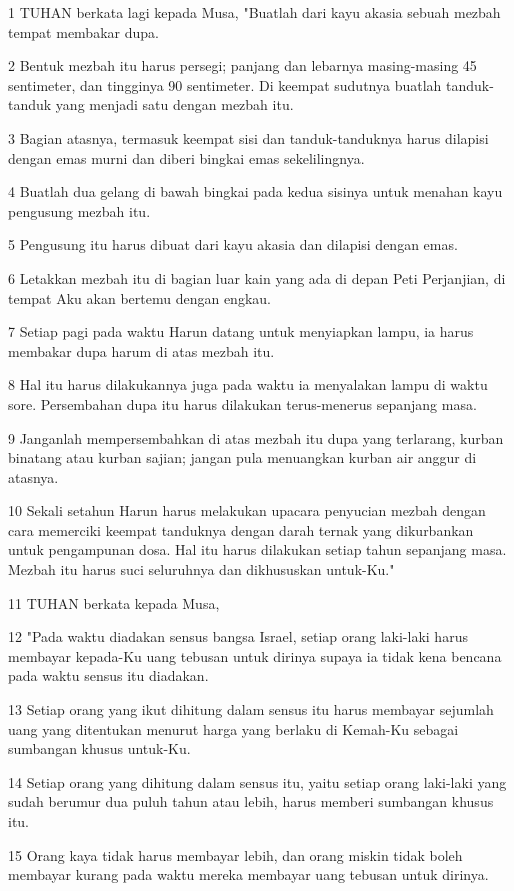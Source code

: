 \par 1 TUHAN berkata lagi kepada Musa, "Buatlah dari kayu akasia sebuah mezbah tempat membakar dupa.
\par 2 Bentuk mezbah itu harus persegi; panjang dan lebarnya masing-masing 45 sentimeter, dan tingginya 90 sentimeter. Di keempat sudutnya buatlah tanduk-tanduk yang menjadi satu dengan mezbah itu.
\par 3 Bagian atasnya, termasuk keempat sisi dan tanduk-tanduknya harus dilapisi dengan emas murni dan diberi bingkai emas sekelilingnya.
\par 4 Buatlah dua gelang di bawah bingkai pada kedua sisinya untuk menahan kayu pengusung mezbah itu.
\par 5 Pengusung itu harus dibuat dari kayu akasia dan dilapisi dengan emas.
\par 6 Letakkan mezbah itu di bagian luar kain yang ada di depan Peti Perjanjian, di tempat Aku akan bertemu dengan engkau.
\par 7 Setiap pagi pada waktu Harun datang untuk menyiapkan lampu, ia harus membakar dupa harum di atas mezbah itu.
\par 8 Hal itu harus dilakukannya juga pada waktu ia menyalakan lampu di waktu sore. Persembahan dupa itu harus dilakukan terus-menerus sepanjang masa.
\par 9 Janganlah mempersembahkan di atas mezbah itu dupa yang terlarang, kurban binatang atau kurban sajian; jangan pula menuangkan kurban air anggur di atasnya.
\par 10 Sekali setahun Harun harus melakukan upacara penyucian mezbah dengan cara memerciki keempat tanduknya dengan darah ternak yang dikurbankan untuk pengampunan dosa. Hal itu harus dilakukan setiap tahun sepanjang masa. Mezbah itu harus suci seluruhnya dan dikhususkan untuk-Ku."
\par 11 TUHAN berkata kepada Musa,
\par 12 "Pada waktu diadakan sensus bangsa Israel, setiap orang laki-laki harus membayar kepada-Ku uang tebusan untuk dirinya supaya ia tidak kena bencana pada waktu sensus itu diadakan.
\par 13 Setiap orang yang ikut dihitung dalam sensus itu harus membayar sejumlah uang yang ditentukan menurut harga yang berlaku di Kemah-Ku sebagai sumbangan khusus untuk-Ku.
\par 14 Setiap orang yang dihitung dalam sensus itu, yaitu setiap orang laki-laki yang sudah berumur dua puluh tahun atau lebih, harus memberi sumbangan khusus itu.
\par 15 Orang kaya tidak harus membayar lebih, dan orang miskin tidak boleh membayar kurang pada waktu mereka membayar uang tebusan untuk dirinya.

